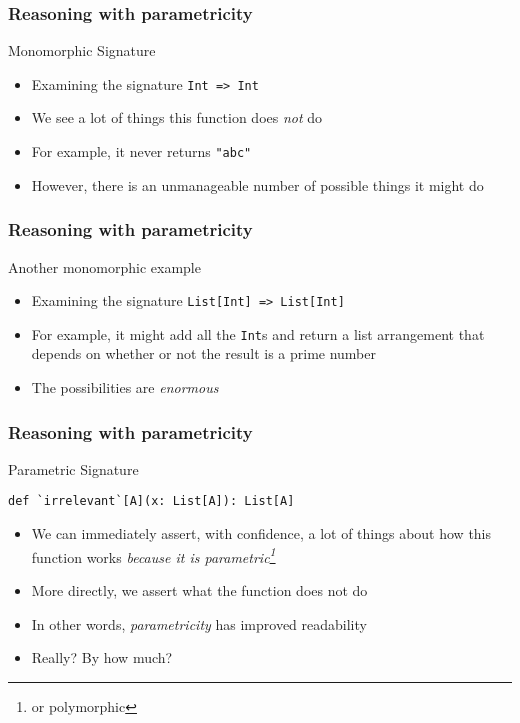 \begin{frame}[fragile]
\frametitle{Reasoning with parametricity}
\begin{block}{Monomorphic Signature}
\begin{itemize}
  \item Examining the signature \lstinline[style=scala]{Int => Int}
  \item We see a lot of things this function does \emph{not} do
  \item For example, it never returns \lstinline[style=scala]{"abc"}
  \item However, there is an unmanageable number of possible things it might do
\end{itemize}
\end{block}
\end{frame}

\begin{frame}[fragile]
\frametitle{Reasoning with parametricity}
\begin{block}{Another monomorphic example}
\begin{itemize}
  \item Examining the signature \lstinline[style=scala]{List[Int] => List[Int]}
  \item For example, it might add all the \lstinline{Int}s and return a list arrangement that depends on whether or not the result is a prime number
  \item The possibilities are \emph{enormous}
\end{itemize}
\end{block}
\end{frame}

\begin{frame}[fragile]
\frametitle{Reasoning with parametricity}
\begin{block}{Parametric Signature}
\begin{lstlisting}[style=scala]
def `irrelevant`[A](x: List[A]): List[A]
\end{lstlisting}
\begin{itemize}
  \item We can immediately assert, with confidence, a lot of things about how this function works \emph{because it is parametric\footnote{or polymorphic}}
  \item More directly, we assert what the function does not do
  \item<2> In other words, \emph{parametricity} has improved readability
  \item<2> Really? By how much?
\end{itemize}
\end{block}
\end{frame}

